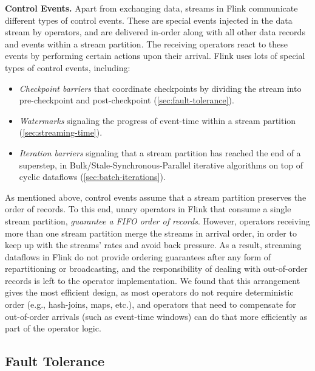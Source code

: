 \documentclass[11pt]{article}
\newcommand{\para}[1]{\vspace{2mm}\noindent\textbf{#1}}
\begin{document}
\para{Control Events.} Apart from exchanging data, streams in Flink communicate different types of control events. These are special events injected in the data stream by operators, and are delivered in-order along with all other data records and events within a stream partition. The receiving operators react to these events by performing certain actions upon their arrival. Flink uses lots of special types of control events, including: \vspace{-2mm}
\begin{itemize}
\item \textit{Checkpoint barriers} that coordinate checkpoints by dividing the stream into pre-checkpoint and post-checkpoint (\autoref{sec:fault-tolerance}). \vspace{-3mm}
\item \textit{Watermarks} signaling the progress of event-time within a stream partition (\autoref{sec:streaming-time}). \vspace{-3mm}
\item \textit{Iteration barriers} signaling that a stream partition has reached the end of a superstep, in Bulk/Stale-Synchronous-Parallel iterative algorithms on top of cyclic dataflows (\autoref{sec:batch-iterations}). \vspace{-1mm}
\end{itemize}

As mentioned above, control events assume that a stream partition preserves the order of records. To this end, unary operators in Flink that consume a single stream partition, \emph{guarantee a FIFO order of records}. However, operators receiving more than one stream partition merge the streams in arrival order, in order to keep up with the streams' rates and avoid back pressure. As a result, streaming dataflows in Flink do not provide ordering guarantees after any form of repartitioning or broadcasting, and the responsibility of dealing with out-of-order records is left to the operator implementation. We found that this arrangement gives the most efficient design, as most operators do not require deterministic order (e.g., hash-joins, maps, etc.), and operators that need to compensate for out-of-order arrivals (such as event-time windows) can do that more efficiently as part of the operator logic.

\vspace{-3mm}
\subsection{Fault Tolerance}
\label{sec:fault-tolerance}
\end{document}

